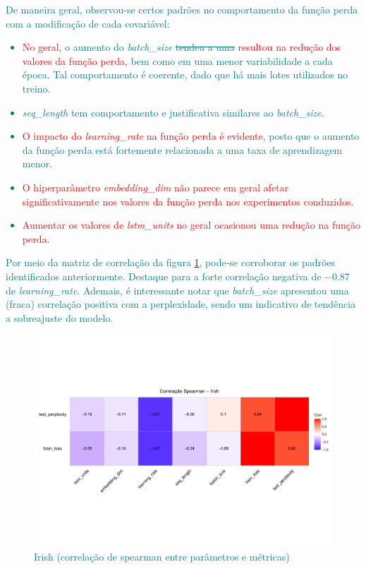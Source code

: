 \documentclass{automatextcc}
\newcommand{\nico}[1]{\textcolor{teal}{#1}}
\newcommand{\pumi}[1]{\textcolor{red}{#1}}
\begin{document}
\nico{
De maneira geral, observou-se certos padrões no comportamento da função perda com a modificação de cada covariável:
\begin{itemize}
    \item \pumi{No geral,} o aumento do \textit{batch\_size} \sout{tendeu a uma} \pumi{resultou na redução dos valores da função perda}, bem como em uma menor variabilidade a cada época. Tal comportamento é coerente, dado que há mais lotes utilizados no treino.
    \item \textit{seq\_length} tem comportamento e justificativa similares ao \textit{batch\_size}.
    \item \pumi{O impacto do \textit{learning\_rate} na função perda é evidente}, posto que o aumento da função perda está fortemente relacionada a uma taxa de aprendizagem menor. 
    \item \pumi{O hiperparâmetro \textit{embedding\_dim} não parece em geral afetar significativamente nos valores da função perda nos experimentos conduzidos.}
    \item \pumi{Aumentar os valores de \textit{lstm\_units} no geral ocasionou uma redução na função perda. }
\end{itemize}
Por meio da matriz de correlação da figura \ref{fig:irish_tanh_corr}, pode-se corroborar os padrões identificados anteriormente. Destaque para a forte correlação negativa de $-0.87$ de \textit{learning\_rate}. Ademais, é interessante notar que \textit{batch\_size} apresentou uma (fraca) correlação positiva com a perplexidade, sendo um indicativo de tendência a sobreajuste do modelo.  
}
\begin{figure}
    \centering
    \includegraphics[width=\textwidth]{irish_tanh_corr.pdf}
    \caption{\nico{Irish (correlação de spearman entre parâmetros e métricas)}}\label{fig:irish_tanh_corr}
\end{figure}
\end{document}
